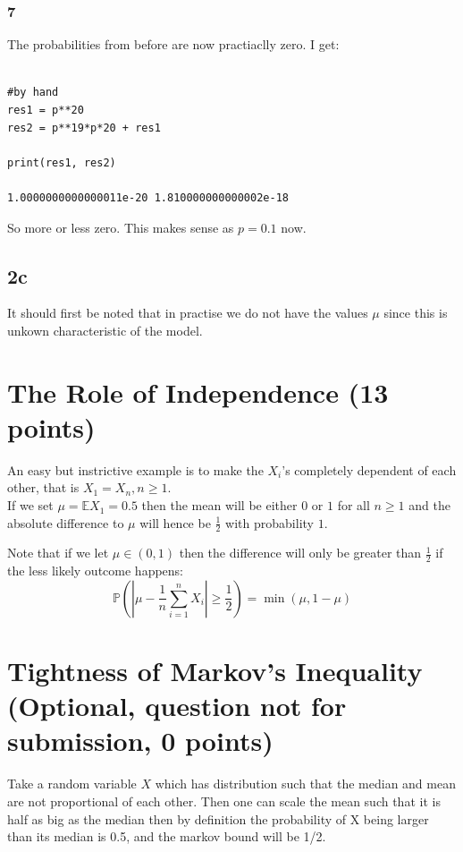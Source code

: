 \documentclass[a4paper,12pt]{article}
\begin{document}
\subsubsection*{7}
The probabilities from before are now practiaclly zero. I get:
\begin{lstlisting}

#by hand
res1 = p**20
res2 = p**19*p*20 + res1

print(res1, res2)

1.0000000000000011e-20 1.810000000000002e-18
\end{lstlisting}

So more or less zero. This makes sense as $p=0.1$ now.

\subsection*{2c}
It should first be noted that in practise we do not have the values $\mu$ since this is unkown characteristic of the model.





\section{The Role of Independence (13 points)}
An easy but instrictive example is to make the $X_i$'s completely dependent of each other, that is $X_1 = X_n, n \geq 1$. \\
If we set $\mu = \mathbb{E} X_1 = 0.5$ then the mean will be either $0$ or $1$ for all $n \geq 1$ and the absolute difference to $\mu$ will hence be $\frac{1}{2}$ with probability $1$. 

Note that if we let $\mu \in (0,1)$ then the difference will only be greater than $\frac{1}{2}$ if the less likely outcome happens:
$$
\mathbb{P}\left( | \mu - \frac{1}{n}\sum_{i = 1}^n X_i  |   \geq \frac{1}{2} \right)  = \min(\mu, 1-\mu)
$$

\section{Tightness of Markov’s Inequality (Optional, question not for submission, 0 points)}

Take a random variable $X$ which has distribution such that the median and mean are not proportional of each other. Then one can scale the mean such that it is half as big as the median then by definition the probability of X being larger than its median is 0.5, and the markov bound will be 1/2.
\end{document}
